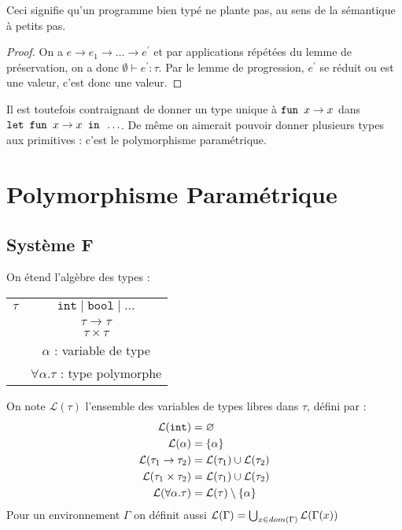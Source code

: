 \documentclass{cours}
\begin{document}
\begin{remark}
    Ceci signifie qu'un programme bien typé ne plante pas, au sens de la sémantique à petits pas.
\end{remark}

\begin{proof}
    On a $e \rightarrow e_{1} \rightarrow \ldots \rightarrow e^{'}$ et par applications répétées du lemme de préservation, on a donc $\emptyset \vdash e^{'} : \tau$. Par le lemme de progression, $e^{'}$ se réduit ou est une valeur, c'est donc une valeur.
\end{proof}

Il est toutefois contraignant de donner un type unique à $\texttt{fun } x \rightarrow x$ dans $\texttt{let } \texttt{fun } x \rightarrow x \texttt{ in }\ldots$. De même on aimerait pouvoir donner plusieurs types aux primitives : c'est le polymorphisme paramétrique.

\section{Polymorphisme Paramétrique}
\subsection{Système F}
On étend l'algèbre des types : 
\begin{tabular}{c@{$\mid$}c}
    $\tau$ & $\texttt{int} \mid \texttt{bool} \mid \ldots$\\
    & $\tau \rightarrow \tau$\\
    &$\tau \times \tau$ \\
    & $\alpha$ : variable de type\\
    & $\forall\alpha.\tau$ : type polymorphe
\end{tabular}

\begin{definition}
    On note $\mathcal{L}(\tau)$ l'ensemble des variables de types libres dans $\tau$, défini par : 
    \[
        \begin{aligned}
            \mathcal{L}(\texttt{int}) &= \varnothing\\
            \mathcal{L}(\alpha) &= \left\{\alpha\right\}\\
            \mathcal{L}(\tau_{1} \rightarrow \tau_{2}) &= \mathcal{L}(\tau_{1}) \cup \mathcal{L}(\tau_{2})\\
            \mathcal{L}(\tau_{1} \times \tau_{2}) &= \mathcal{L}(\tau_{1}) \cup \mathcal{L}(\tau_{2})\\
            \mathcal{L}(\forall\alpha.\tau) &= \mathcal{L}(\tau) \setminus \left\{\alpha\right\}
        \end{aligned}    
    \]
    Pour un environnement $\Gamma$ on définit aussi $\mathcal{L}(\Gamma) = \bigcup_{x \in dom(\Gamma)} \mathcal{L}(\Gamma(x))$
\end{definition}
\end{document}

